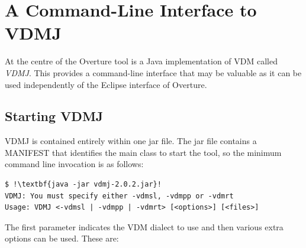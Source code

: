 \documentclass{overturerepchap}
\begin{document}
\chapter{A Command-Line Interface to VDMJ}\label{sec:commandline}

At the centre of the Overture tool is a Java implementation of VDM
called \emph{VDMJ}. This provides a command-line interface that may be valuable
as it can be used independently of the Eclipse interface of Overture.

\section{Starting VDMJ}

VDMJ is contained entirely within one jar file. The jar
file contains a MANIFEST that identifies the main class to start the
tool, so the minimum command line invocation is as follows:

\lstset{style=tool,language=}
\begin{lstlisting}
$ !\textbf{java -jar vdmj-2.0.2.jar}!
VDMJ: You must specify either -vdmsl, -vdmpp or -vdmrt
Usage: VDMJ <-vdmsl | -vdmpp | -vdmrt> [<options>] [<files>]
\end{lstlisting}
\lstset{style=mystyle}
\lstset{language=VDM++}

The first parameter indicates the VDM dialect to use and then
various extra options can be used. These are:
\end{document}
